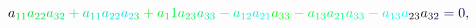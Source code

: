 \documentclass[12pt]{article}
\begin{document}
\begin{displaymath}
{a} _ { \mathcolor[RGB]{0,225,15}{1} \mathcolor[RGB]{0,225,30}{1} } \mathcolor[RGB]{0,225,45}{a} _ { \mathcolor[RGB]{0,225,60}{2} \mathcolor[RGB]{0,225,75}{2} } \mathcolor[RGB]{0,225,90}{a} _ { \mathcolor[RGB]{0,225,105}{3} \mathcolor[RGB]{0,225,120}{2} } \mathcolor[RGB]{0,225,135}{+} \mathcolor[RGB]{0,225,150}{a} _ { \mathcolor[RGB]{0,225,165}{1} \mathcolor[RGB]{0,225,180}{1} } \mathcolor[RGB]{0,225,195}{a} _ { \mathcolor[RGB]{0,225,210}{2} \mathcolor[RGB]{0,225,225}{2} } \mathcolor[RGB]{0,225,240}{a} _ { \mathcolor[RGB]{0,225,255}{2} \mathcolor[RGB]{0,240,0}{3} } \mathcolor[RGB]{0,240,15}{+} \mathcolor[RGB]{0,240,30}{a} _ { \mathcolor[RGB]{0,240,45}{1} } \mathcolor[RGB]{0,240,60}{1} \mathcolor[RGB]{0,240,75}{a} _ { \mathcolor[RGB]{0,240,90}{2} \mathcolor[RGB]{0,240,105}{3} } \mathcolor[RGB]{0,240,120}{a} _ { \mathcolor[RGB]{0,240,135}{3} \mathcolor[RGB]{0,240,150}{3} } \mathcolor[RGB]{0,240,165}{-} \mathcolor[RGB]{0,240,180}{a} _ { \mathcolor[RGB]{0,240,195}{1} \mathcolor[RGB]{0,240,210}{2} } \mathcolor[RGB]{0,240,225}{a} _ { \mathcolor[RGB]{0,240,240}{2} \mathcolor[RGB]{0,240,255}{1} } \mathcolor[RGB]{0,255,0}{a} _ { \mathcolor[RGB]{0,255,15}{3} \mathcolor[RGB]{0,255,30}{3} } \mathcolor[RGB]{0,255,45}{-} \mathcolor[RGB]{0,255,60}{a} _ { \mathcolor[RGB]{0,255,75}{1} \mathcolor[RGB]{0,255,90}{3} } \mathcolor[RGB]{0,255,105}{a} _ { \mathcolor[RGB]{0,255,120}{2} \mathcolor[RGB]{0,255,135}{1} } \mathcolor[RGB]{0,255,150}{a} _ { \mathcolor[RGB]{0,255,165}{3} \mathcolor[RGB]{0,255,180}{3} } \mathcolor[RGB]{0,255,195}{-} \mathcolor[RGB]{0,255,210}{a} _ { \mathcolor[RGB]{0,255,225}{1} \mathcolor[RGB]{0,255,240}{3} } \mathcolor[RGB]{0,255,255}{a} _ { \mathcolor[RGB]{15,0,0}{2} \mathcolor[RGB]{15,0,15}{3} } \mathcolor[RGB]{15,0,30}{a} _ { \mathcolor[RGB]{15,0,45}{3} \mathcolor[RGB]{15,0,60}{2} } \mathcolor[RGB]{15,0,75}{=} \mathcolor[RGB]{15,0,90}{0} \mathcolor[RGB]{15,0,105}{,} \mathcolor[RGB]{15,0,120}{\,
}
\end{displaymath}
\end{document}
